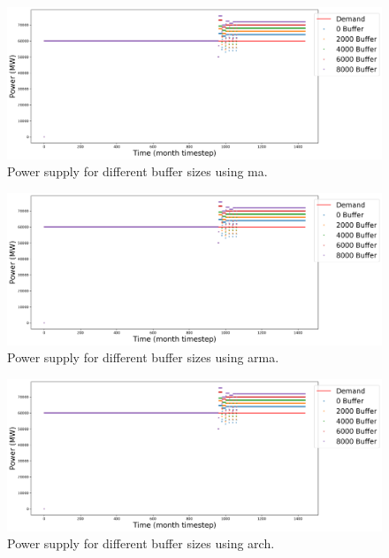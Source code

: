 \documentclass[11pt]{article}
\begin{document}
\begin{figure}[H]
	\centering
	\includegraphics[width=\textwidth]{29-figures/29-power-buffer-ma.png} 
	\hfill
	\caption{Power supply for different buffer sizes using ma.}
	\label{fig:29-buf-ma}
\end{figure}

\begin{figure}[H]
	\centering
	\includegraphics[width=\textwidth]{29-figures/29-power-buffer-arma.png} 
	\hfill
	\caption{Power supply for different buffer sizes using arma.}
	\label{fig:29-buf-arma}
\end{figure}

\begin{figure}[H]
	\centering
	\includegraphics[width=\textwidth]{29-figures/29-power-buffer-arch.png} 
	\hfill
	\caption{Power supply for different buffer sizes using arch.}
	\label{fig:29-buf-arch}
\end{figure}
\end{document}
